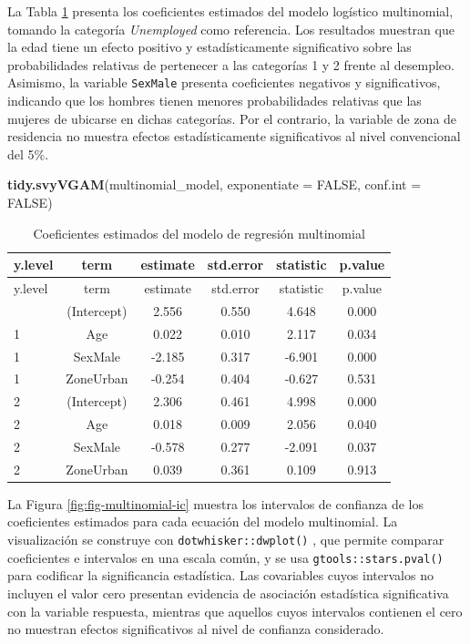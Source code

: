 \documentclass[
  spanish,
  12pt,
]{book}
\newenvironment{Shaded}{\begin{snugshade}}{\end{snugshade}}
\newcommand{\AttributeTok}[1]{\textcolor[rgb]{0.13,0.29,0.53}{#1}}
\newcommand{\ConstantTok}[1]{\textcolor[rgb]{0.56,0.35,0.01}{#1}}
\newcommand{\FunctionTok}[1]{\textcolor[rgb]{0.13,0.29,0.53}{\textbf{#1}}}
\newcommand{\NormalTok}[1]{#1}
\begin{document}
La Tabla \ref{tab:tab-multinomial-coef} presenta los coeficientes estimados del modelo logístico multinomial, tomando la categoría \emph{Unemployed} como referencia. Los resultados muestran que la edad tiene un efecto positivo y estadísticamente significativo sobre las probabilidades relativas de pertenecer a las categorías 1 y 2 frente al desempleo. Asimismo, la variable \texttt{SexMale} presenta coeficientes negativos y significativos, indicando que los hombres tienen menores probabilidades relativas que las mujeres de ubicarse en dichas categorías. Por el contrario, la variable de zona de residencia no muestra efectos estadísticamente significativos al nivel convencional del 5\%.

\begin{Shaded}
\begin{Highlighting}[]
\FunctionTok{tidy.svyVGAM}\NormalTok{(multinomial\_model, }\AttributeTok{exponentiate =} \ConstantTok{FALSE}\NormalTok{, }\AttributeTok{conf.int =} \ConstantTok{FALSE}\NormalTok{)}
\end{Highlighting}
\end{Shaded}

\begin{longtable}[]{@{}lccccc@{}}
\caption{\label{tab:tab-multinomial-coef}Coeficientes estimados del modelo de regresión multinomial}\tabularnewline
\toprule\noalign{}
y.level & term & estimate & std.error & statistic & p.value \\
\midrule\noalign{}
\endfirsthead
\toprule\noalign{}
y.level & term & estimate & std.error & statistic & p.value \\
\midrule\noalign{}
\endhead
\bottomrule\noalign{}
\endlastfoot
1 & (Intercept) & 2.556 & 0.550 & 4.648 & 0.000 \\
1 & Age & 0.022 & 0.010 & 2.117 & 0.034 \\
1 & SexMale & -2.185 & 0.317 & -6.901 & 0.000 \\
1 & ZoneUrban & -0.254 & 0.404 & -0.627 & 0.531 \\
2 & (Intercept) & 2.306 & 0.461 & 4.998 & 0.000 \\
2 & Age & 0.018 & 0.009 & 2.056 & 0.040 \\
2 & SexMale & -0.578 & 0.277 & -2.091 & 0.037 \\
2 & ZoneUrban & 0.039 & 0.361 & 0.109 & 0.913 \\
\end{longtable}

La Figura \ref{fig:fig-multinomial-ic} muestra los intervalos de confianza de los coeficientes estimados para cada ecuación del modelo multinomial. La visualización se construye con \texttt{dotwhisker::dwplot()} \citep{dotwhisker2025}, que permite comparar coeficientes e intervalos en una escala común, y se usa \texttt{gtools::stars.pval()} \citep{gtools2025} para codificar la significancia estadística. Las covariables cuyos intervalos no incluyen el valor cero presentan evidencia de asociación estadística significativa con la variable respuesta, mientras que aquellos cuyos intervalos contienen el cero no muestran efectos significativos al nivel de confianza considerado.
\end{document}
